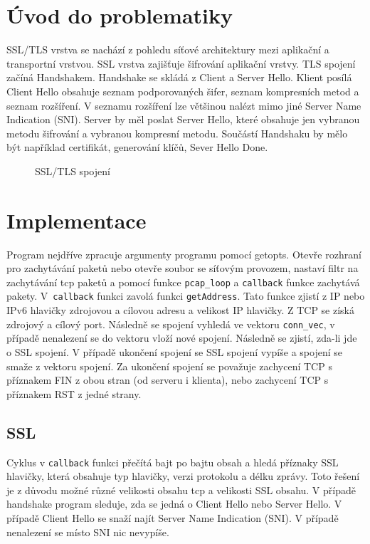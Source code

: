 \documentclass[a4paper, 12pt, titlepage]{article}
\begin{document}

\tableofcontents
\newpage

\section{Úvod do problematiky}
SSL/TLS vrstva se nachází z pohledu síťové architektury mezi aplikační a transportní vrstvou. SSL vrstva zajišťuje šifrování aplikační vrstvy. TLS spojení začíná Handshakem. Handshake se skládá z Client a Server Hello. Klient posílá Client Hello obsahuje seznam podporovaných šifer, seznam kompresních metod a seznam rozšíření. V seznamu rozšíření lze většinou nalézt mimo jiné Server Name Indication (SNI). Server by měl poslat Server Hello, které obsahuje jen vybranou metodu šifrování a vybranou kompresní metodu. Součástí Handshaku by mělo být například certifikát, generování klíčů, Sever Hello Done. 

\begin{figure}[H]
    \centering
    \caption{SSL/TLS spojení\cite{obr1}}
    \label{obrazek 1}
\end{figure}

\section{Implementace}
Program nejdříve zpracuje argumenty programu pomocí getopts\cite{getopt}. Otevře rozhraní pro zachytávání paketů nebo otevře soubor se síťovým provozem, nastaví filtr na zachytávání tcp paketů a pomocí funkce \verb|pcap_loop| a \verb|callback| funkce\cite{pcap} zachytává pakety. V~\verb|callback| funkci zavolá funkci \verb|getAddress|. Tato funkce zjistí z IP nebo IPv6 hlavičky zdrojovou a cílovou adresu a velikost IP hlavičky. Z TCP se získá zdrojový a cílový port. Následně se spojení vyhledá ve vektoru \verb|conn_vec|, v případě nenalezení se do vektoru vloží nové spojení. Následně se zjistí, zda-li jde o SSL spojení. V případě ukončení spojení se SSL spojení vypíše a spojení se smaže z vektoru spojení. Za ukončení spojení se považuje zachycení TCP s příznakem FIN z obou stran (od serveru i klienta), nebo zachycení TCP s příznakem RST z jedné strany.


\subsection{SSL}
Cyklus v \verb|callback| funkci přečítá bajt po bajtu obsah a hledá příznaky SSL hlavičky, která obsahuje typ hlavičky, verzi protokolu a délku zprávy. Toto řešení je z důvodu možné různé velikosti obsahu tcp a velikosti SSL obsahu. V případě handshake program sleduje, zda se jedná o Client Hello nebo Server Hello. V případě Client Hello se snaží najít Server Name Indication (SNI). V případě nenalezení se místo SNI nic nevypíše.
\end{document}
